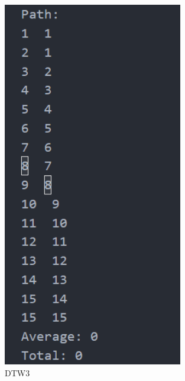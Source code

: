 \documentclass[12pt,a4paper]{article}
\theoremstyle{definition}
\begin{document}
\begin{appendices}
\begin{figure}[H] %
\centering %
\includegraphics[width=0.7\textwidth]{4.png} %
\caption{DTW3} %
\label{} %
\end{figure}


\end{appendices}
\end{document}
